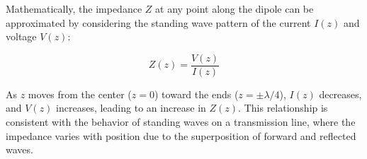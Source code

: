 Mathematically, the impedance \( Z \) at any point along the dipole can be approximated by considering the standing wave pattern of the current \( I(z) \) and voltage \( V(z) \):

\[
Z(z) = \frac{V(z)}{I(z)}
\]

As \( z \) moves from the center (\( z = 0 \)) toward the ends (\( z = \pm \lambda/4 \)), \( I(z) \) decreases, and \( V(z) \) increases, leading to an increase in \( Z(z) \). This relationship is consistent with the behavior of standing waves on a transmission line, where the impedance varies with position due to the superposition of forward and reflected waves.

